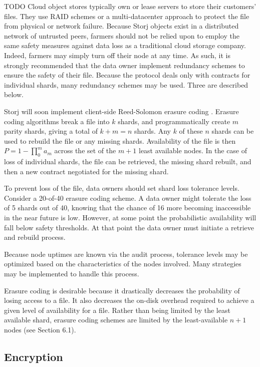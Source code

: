 \documentclass[a4paper,10pt]{article}
\newcommand{\todo}[1]{{\color{red} TODO #1}}
\begin{document}
\todo{
Cloud object stores typically own or lease servers to store their customers’
files. They use RAID schemes or a multi-datacenter approach to protect the file
from physical or network failure. Because Storj objects exist in a distributed
network of untrusted peers, farmers should not be relied upon to employ the same
safety measures against data loss as a traditional cloud storage company.
Indeed, farmers may simply turn off their node at any time. As such, it is
strongly recommended that the data owner implement redundancy schemes to ensure
the safety of their file. Because the protocol deals only with contracts for
individual shards, many redundancy schemes may be used. Three are described
below.

Storj will soon implement client-side Reed-Solomon erasure coding \cite{27}.
Erasure coding algorithms break a file into $ k $ shards, and programmatically
create $ m $ parity shards, giving a total of $ k + m = n $ shards. Any $ k $ of
these $ n $ shards can be used to rebuild the file or any missing shards.
Availability of the file is then $ P = 1 - \prod_{0}^{m} a_{m} $ across the set
of the $m + 1$ least available nodes. In the case of loss of individual shards,
the file can be retrieved, the missing shard rebuilt, and then a new contract
negotiated for the missing shard.

To prevent loss of the file, data owners should set shard loss tolerance levels.
Consider a 20-of-40 erasure coding scheme. A data owner might tolerate the loss
of 5 shards out of 40, knowing that the chance of 16 more becoming inaccessible
in the near future is low. However, at some point the probabilistic availability
will fall below safety thresholds. At that point the data owner must initiate a
retrieve and rebuild process.

Because node uptimes are known via the audit process, tolerance levels may be
optimized based on the characteristics of the nodes involved. Many strategies
may be implemented to handle this process.

Erasure coding is desirable because it drastically decreases the probability of
losing access to a file. It also decreases the on-disk overhead required to
achieve a given level of availability for a file. Rather than being limited by
the least available shard, erasure coding schemes are limited by the
least-available $ n + 1 $ nodes (see Section 6.1).
}

\subsection{Encryption}
\end{document}
